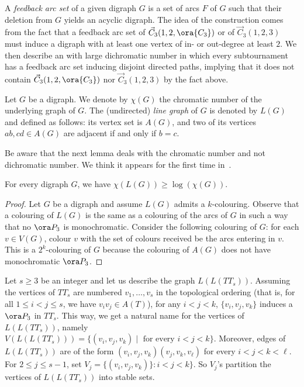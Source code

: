 A \emph{feedback arc set} of a given digraph $G$ is a set of arcs $F$ of $G$ such that their deletion from $G$ yields an acyclic digraph. 
The idea of the construction comes from the fact that a feedback arc set of $\vec C_{3}(1,2, \ora{C_3})$ or of $\vec C_{3}(1,2,3)$ must induce a digraph with at least one vertex of in- or out-degree at least $2$. We then describe an \omg with large dichromatic number in which every subtournament has a feedback arc set inducing disjoint directed paths, implying that it does not contain $\vec C_{3}(1,2, \ora{C_3})$ nor $\vec C_{3}(1,2,3)$ by the fact above. 

\smallskip
Let $G$ be a digraph. We denote by $\chi(G)$ the chromatic number of the underlying graph of $G$. 
The (undirected) \emph{line graph} of $G$ is denoted by $L(G)$ and defined as follows: its vertex set is $A(G)$, and two of its vertices $ab, cd \in A(G)$ are adjacent if and only if $b=c$. 

Be aware that the next lemma deals with the chromatic number and not dichromatic number. We think it appears for the first time in~\cite{EH66}.

\begin{lemma}\cite{EH66}\label{lem:line_graph}
For every digraph $G$, we have $\chi(L(G)) \geq \log(\chi(G))$. 
\end{lemma}

\begin{proof}
Let $G$ be a digraph and assume $L(G)$ admits a $k$-colouring.
Observe that a colouring of $L(G)$ is the same as a colouring of the arcs of $G$ in such a way that no $\ora P_3$ is monochromatic. 
Consider the following colouring of $G$: for each $v \in V(G)$, colour $v$ with the set of colours received be the arcs entering in $v$. This is a $2^k$-colouring of $G$ because the colouring of $A(G)$ does not have monochromatic $\ora P_3$. 
\end{proof}

Let $s \geq 3$ be an integer and let us describe the graph $L(L(TT_s))$. Assuming the vertices of $TT_s$ are numbered $v_1, \dots, v_s$ in the topological ordering (that is, for all $1 \le i<j \le s$, we have $v_iv_j \in A(T)$), for any $i<j<k$, $\{v_i,v_j,v_k\}$ induces a $\ora P_3$ in $TT_s$. This way, we get a natural name for the vertices of $L(L(TT_s))$, namely $V(L(L(TT_s))) =  \{(v_i,v_j,v_k) \mid \text{ for every } i <j <k\}$. Moreover, edges of $L(L(TT_s))$ are of the form $(v_i,v_j,v_k)(v_j,v_k,v_{\ell})$ for  every $i<j<k<\ell$. For $2 \leq j \leq s-1$, set $V_j=\{(v_i,v_j,v_k)\}: i<j<k\}$. So $V_j$'s partition the vertices of  $L(L(TT_s))$ into stable sets.

